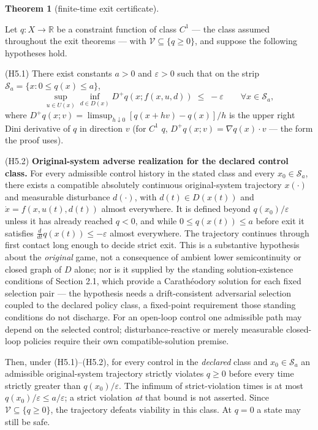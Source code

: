 \documentclass[10pt,twocolumn]{article}
\theoremstyle{definition}
\newtheorem{theorem}{Theorem}
\begin{document}
\begin{theorem}[finite-time exit certificate]\label{calc-thm:exit}

Let \(q : X \to \mathbb{R}\) be a constraint function of class \(C^1\) --- the class assumed throughout the exit theorems --- with
\(\mathcal{V} \subseteq \{ q \ge 0 \}\), and suppose the following
hypotheses hold.

(H5.1) There exist constants \(a > 0\) and \(\varepsilon > 0\) such that
on the strip \(\mathcal{S}_a = \{ x : 0 \le q(x) \le a \}\),
\[\sup_{u \in U(x)} \inf_{d \in D(x)} D^+ q(x; f(x,u,d)) \;\le\; -\varepsilon \qquad \forall x \in \mathcal{S}_a, \tag{4}\]
where \(D^+ q(x; v) = \limsup_{h \downarrow 0} [q(x + hv) - q(x)]/h\) is
the upper right Dini derivative of \(q\) in direction \(v\) (for \(C^1\)
\(q\), \(D^+ q(x; v) = \nabla q(x) \cdot v\) --- the form the proof
uses).

(H5.2) \textbf{Original-system adverse realization for the declared control class.} For every admissible control history in the stated class and every \(x_0\in\mathcal S_a\), there exists a compatible absolutely continuous original-system trajectory \(x(\cdot)\) and measurable disturbance \(d(\cdot)\), with \(d(t)\in D(x(t))\) and \(\dot x=f(x,u(t),d(t))\) almost everywhere. It is defined beyond \(q(x_0)/\varepsilon\) unless it has already reached \(q<0\), and while \(0\le q(x(t))\le a\) before exit it satisfies \(\frac{d}{dt}q(x(t))\le-\varepsilon\) almost everywhere. The trajectory continues through first contact long enough to decide strict exit. This is a substantive hypothesis about the \emph{original} game, not a consequence of ambient lower semicontinuity or closed graph of \(D\) alone; nor is it supplied by the standing solution-existence conditions of Section 2.1, which provide a Carath\'eodory solution for each fixed selection pair --- the hypothesis needs a drift-consistent adversarial selection coupled to the declared policy class, a fixed-point requirement those standing conditions do not discharge. For an open-loop control one admissible path may depend on the selected control; disturbance-reactive or merely measurable closed-loop policies require their own compatible-solution premise.

Then, under (H5.1)--(H5.2), for every control in the \emph{declared} class and \(x_0\in\mathcal S_a\) an admissible original-system trajectory strictly violates \(q\ge0\) before every time strictly greater than \(q(x_0)/\varepsilon\). The infimum of strict-violation times is at most \(q(x_0)/\varepsilon\le a/\varepsilon\); a strict violation \emph{at} that bound is not asserted. Since \(\mathcal V\subseteq\{q\ge0\}\), the trajectory defeats viability in this class. At \(q=0\) a state may still be safe.
\end{theorem}
\end{document}
